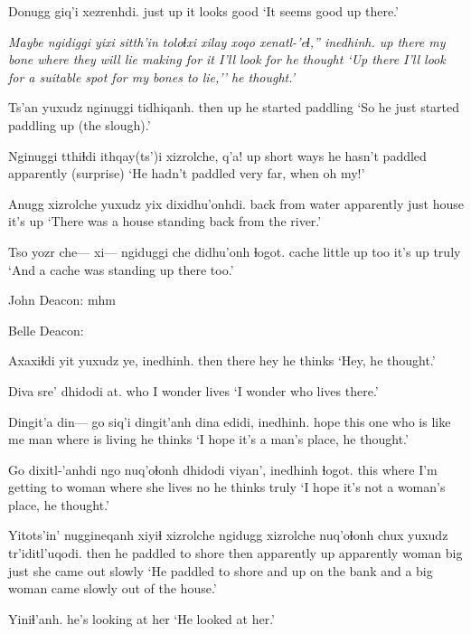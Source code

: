 \documentclass[12pt]{article}
\begin{document}
\gll Donugg {giq'i xezrenhdi.} 
{just up} {it looks good}
\glt `It seems good up there.' 
\glend

\gll \em Maybe ngidiggi yixi sitth'in toloɬxi xilay xoqo xenatl-'eɬ,'' inedhinh. 
{} up   there  {my bone} {where they will lie} making {for it} {I'll look for} {he thought}
\glt `Up there I'll look for a suitable spot for my bones to lie,'' he thought.' 
\glend

\gll Ts'an yuxudz nginuggi tidhiqanh. 
then  {} up {he started paddling}
\glt `So he just started paddling up (the slough).' 
\glend

\gll Nginuggi tthiɬdi ithqay(ts')i xizrolche,  q'a! 
up     {short ways} {he hasn't paddled} apparently   {(surprise)}  
\glt `He hadn't paddled very far, when oh my!'
\glend

\gll Anugg xizrolche yuxudz yix dixidhu'onhdi. 
{back from water} apparently just house {it's up}
\glt  `There was a house standing back from the river.' 
\glend

\gll Tso yozr {che--- xi---} ngiduggi che didhu'onh ɬogot. 
cache little  up too {it's up} truly
\glt `And a cache was standing up there too.' 
\glend

John Deacon:  mhm

Belle Deacon:  

\gll Axaxiɬdi yit yuxudz ye, inedhinh. 
then there {} hey {he thinks}
\glt `Hey, he thought.' 
\glend

\gll Diva sre' dhidodi at.
who {I wonder} {lives} 
\glt `I wonder who lives there.'
\glend

\gll Dingit'a din--- go {siq'i dingit'anh} dina edidi, inedhinh. 
hope {} this {one who is like me} man {where is living} {he thinks}
\glt `I hope it's a man's place, he thought.' 
\glend

\gll Go dixitl-'anhdi ngo nuq'oɬonh dhidodi viyan', inedhinh ɬogot.
this {where I'm getting to} {} woman {where she lives} no {he thinks} truly
\glt `I hope it's not a woman's place, he thought.' 
\glend

\gll Yitots'in' nuggineqanh xiyiɬ xizrolche ngidugg xizrolche nuq'oɬonh chux yuxudz tr'iditl'uqodi. 
then  {he paddled to shore} then apparently up apparently woman big just {she came out slowly}
\glt `He paddled to shore and up on the bank and a big woman came slowly out of the house.' 
\glend

\gll Yiniɬ'anh. 
{{he's looking at her}}
\glt `He looked at her.' 
\glend
\end{document}
